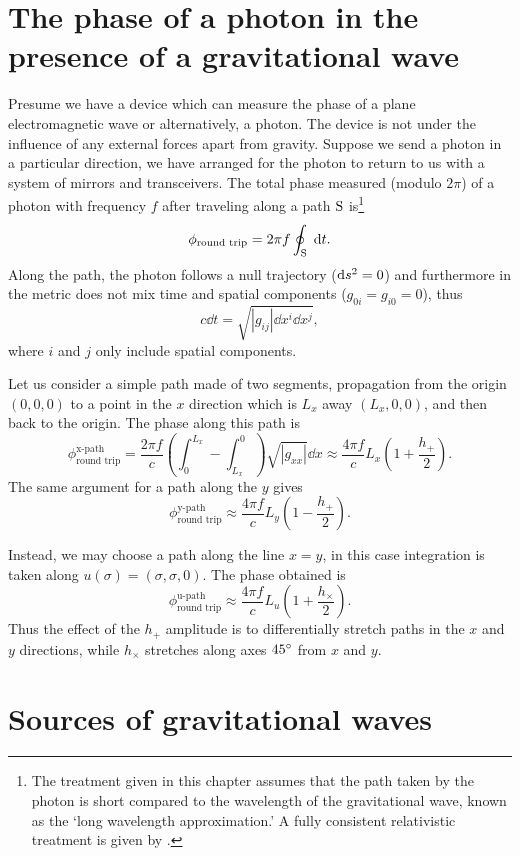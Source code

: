 
\section{The phase of a photon in the presence of a gravitational wave}
Presume we have a device which can measure the phase of a plane electromagnetic wave or alternatively, a photon. %
The device is not under the influence of any external forces apart from gravity. %
Suppose we send a photon in a particular direction, we have arranged for the photon to return to us with a system of mirrors and transceivers. %
The total phase measured (modulo $2\pi$) of a photon with frequency $f$ after traveling along a path $\rm S$ is\footnote{The treatment given in this chapter assumes that the path taken by the photon is short compared to the wavelength of the gravitational wave, known as the `long wavelength approximation.' A fully consistent relativistic treatment is given by \citet{RakhmanovPhoton}.}
\begin{equation}
\phi_{\text{round trip}} = 2\pi f\oint_{\rm S} \; \mathrm{d} t.
\end{equation}
Along the path, the photon follows a null trajectory ($\mathrm{d} s^2=0$) and furthermore in  the metric does not mix time and spatial components ($g_{0i}=g_{i0}=0$), thus
\begin{equation}
c\dd t = \sqrt{|g_{ij}|\dd x^i \dd x^j},
\end{equation}
where $i$ and $j$ only include spatial components.

Let us consider a simple path made of two segments, propagation from the origin $(0,0,0)$ to a point in the $x$ direction which is $L_x$ away $(L_x,0,0)$, and then back to the origin. %
The phase along this path is
\begin{equation}
\phi_{\text{round trip}}^{\text{x-path}}= \frac{2\pi f}{c} \left(\int_0^{L_x}-\int^0_{L_x}\right)\sqrt{|g_{xx}|}\dd x \approx \frac{4\pi f}{c} L_x \left(1+\frac{h_+}{2}\right).
\end{equation} 
The same argument for a path along the $y$ gives
\begin{equation}
\phi_{\text{round trip}}^{\text{y-path}} \approx \frac{4\pi f}{c} L_y \left(1-\frac{h_+}{2}\right).
\end{equation} 

Instead, we may choose a path along the line $x=y$, in this case integration is taken along $ u(\sigma) = (\sigma,\sigma,0)$. %
The phase obtained is
\begin{equation}
\phi_{\text{round trip}}^{\text{u-path}} \approx \frac{4\pi f}{c} L_u \left(1+\frac{h_\times}{2}\right).
\end{equation} 
Thus the effect of the $h_+$ amplitude is to differentially stretch paths in the $x$ and $y$ directions, while $h_\times$ stretches along axes $45 ^\circ$ from $x$ and $y$. %

\section{Sources of gravitational waves}

